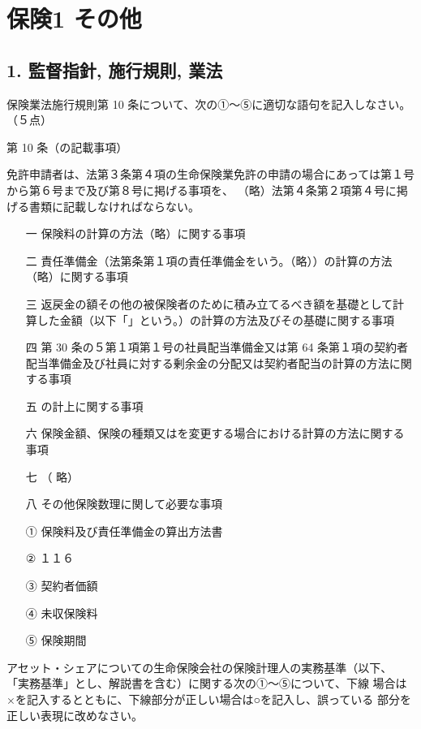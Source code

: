 \documentclass[report,gutter=10mm,fore-edge=10mm,uplatex,dvipdfmx]{jlreq}
\begin{document}
\chapter{保険1 その他}
\section{1. 監督指針, 施行規則, 業法}

保険業法施行規則第 10 条について、次の①～⑤に適切な語句を記入しなさい。（５点）

第 10 条（の記載事項）

免許申請者は、法第３条第４項の生命保険業免許の申請の場合にあっては第１号から第６号まで及び第８号に掲げる事項を、
（略）法第４条第２項第４号に掲げる書類に記載しなければならない。

\begin{itemize}
\item[ 一  ] 保険料の計算の方法（略）に関する事項
\item[ 二  ] 責任準備金（法第条第１項の責任準備金をいう。（略））の計算の方法（略）に関する事項
\item[ 三  ] 返戻金の額その他の被保険者のために積み立てるべき額を基礎として計算した金額（以下「」という。）の計算の方法及びその基礎に関する事項
\item[ 四  ] 第 30 条の５第１項第１号の社員配当準備金又は第 64 条第１項の契約者配当準備金及び社員に対する剰余金の分配又は契約者配当の計算の方法に関する事項
\item[ 五  ] の計上に関する事項
\item[ 六  ] 保険金額、保険の種類又はを変更する場合における計算の方法に関する事項
\item[ 七  ]（ 略）
\item[ 八  ] その他保険数理に関して必要な事項
\end{itemize}

\answer{}
\begin{itemize}
\item[ ① ] 保険料及び責任準備金の算出方法書 
\item[ ② ] １１６ 
\item[ ③ ] 契約者価額 
\item[ ④ ] 未収保険料
\item[ ⑤ ] 保険期間
\end{itemize}

アセット・シェアについての生命保険会社の保険計理人の実務基準（以下、
「実務基準」とし、解説書を含む）に関する次の①～⑤について、下線
場合は×を記入するとともに、下線部分が正しい場合は○を記入し、誤っている
部分を正しい表現に改めなさい。
\end{document}
